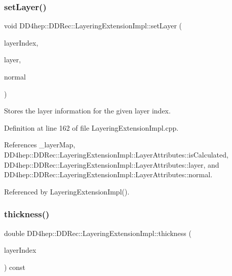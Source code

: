 \subsubsection{\texorpdfstring{set\+Layer()}{setLayer()}}
{\footnotesize\ttfamily void D\+D4hep\+::\+D\+D\+Rec\+::\+Layering\+Extension\+Impl\+::set\+Layer (\begin{DoxyParamCaption}\item[{int}]{layer\+Index,  }\item[{\hyperlink{class_d_d4hep_1_1_geometry_1_1_det_element}{Geometry\+::\+Det\+Element}}]{layer,  }\item[{const \hyperlink{class_d_d4hep_1_1_d_d_rec_1_1_layering_extension_impl_a34281f7585bbe0d61654c9924e2789e3}{Position} \&}]{normal }\end{DoxyParamCaption})}



Stores the layer information for the given layer index. 



Definition at line 162 of file Layering\+Extension\+Impl.\+cpp.



References \+\_\+layer\+Map, D\+D4hep\+::\+D\+D\+Rec\+::\+Layering\+Extension\+Impl\+::\+Layer\+Attributes\+::is\+Calculated, D\+D4hep\+::\+D\+D\+Rec\+::\+Layering\+Extension\+Impl\+::\+Layer\+Attributes\+::layer, and D\+D4hep\+::\+D\+D\+Rec\+::\+Layering\+Extension\+Impl\+::\+Layer\+Attributes\+::normal.



Referenced by Layering\+Extension\+Impl().

\hypertarget{class_d_d4hep_1_1_d_d_rec_1_1_layering_extension_impl_a2bea36deda3a0b6962f4c24243749705}{}\label{class_d_d4hep_1_1_d_d_rec_1_1_layering_extension_impl_a2bea36deda3a0b6962f4c24243749705} 
\subsubsection{\texorpdfstring{thickness()}{thickness()}}
{\footnotesize\ttfamily double D\+D4hep\+::\+D\+D\+Rec\+::\+Layering\+Extension\+Impl\+::thickness (\begin{DoxyParamCaption}\item[{int}]{layer\+Index }\end{DoxyParamCaption}) const\hspace{0.3cm}{\ttfamily [virtual]}}



